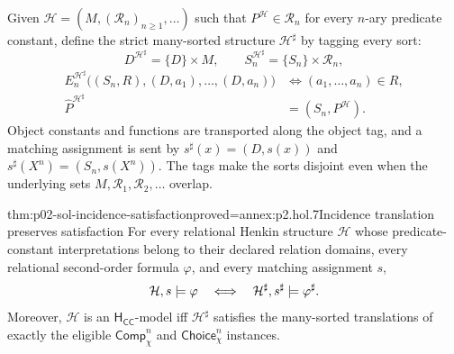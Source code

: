 Given \(\mathcal H=(M,(\mathcal R_n)_{n\geq1},\ldots)\) such that
\(P^{\mathcal H}\in\mathcal R_n\) for every \(n\)-ary predicate constant,
define the strict many-sorted structure \(\mathcal H^\sharp\) by tagging every
sort:
\[
 D^{\mathcal H^\sharp}=\{D\}\times M,
 \qquad S_n^{\mathcal H^\sharp}=\{S_n\}\times\mathcal R_n,
\]
\[
\begin{aligned}
 E_n^{\mathcal H^\sharp}
   \bigl((S_n,R),(D,a_1),\ldots,(D,a_n)\bigr)
 &\Longleftrightarrow(a_1,\ldots,a_n)\in R,\\
 \widehat P^{\mathcal H^\sharp}&=(S_n,P^{\mathcal H}).
\end{aligned}
\]
Object constants and functions are transported along the object tag, and a
matching assignment is sent by
\(s^\sharp(x)=(D,s(x))\) and
\(s^\sharp(X^n)=(S_n,s(X^n))\).  The tags make the sorts disjoint even when
the underlying sets \(M,\mathcal R_1,\mathcal R_2,\ldots\) overlap.

\begin{hbtheorem}{thm:p02-sol-incidence-satisfaction}{proved=annex:p2.hol.7}{Incidence translation preserves satisfaction}
For every relational Henkin structure \(\mathcal H\) whose predicate-constant
interpretations belong to their declared relation domains, every relational
second-order formula \(\varphi\), and every matching assignment \(s\),
\[
 \mathcal H,s\models\varphi
 \quad\Longleftrightarrow\quad
 \mathcal H^\sharp,s^\sharp\models\varphi^\sharp.
\]
Moreover, \(\mathcal H\) is an \(\mathsf H_{\mathsf{CC}}\)-model iff
\(\mathcal H^\sharp\) satisfies the many-sorted translations of exactly the
eligible \(\mathsf{Comp}_{\chi}^{n}\) and
\(\mathsf{Choice}_{\chi}^{n}\) instances.
\end{hbtheorem}

